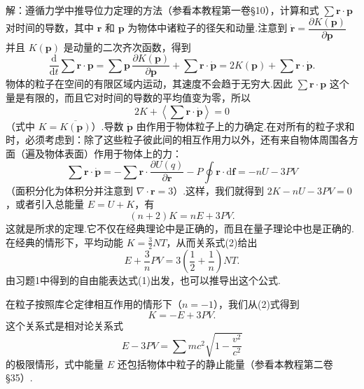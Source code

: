 \begin{xiti}
解：遵循力学中推导位力定理的方法（参看本教程第一卷§10），计算和式 $\sum\boldsymbol{r}\cdot\boldsymbol{p}$ 对时间的导数，其中 $\boldsymbol{r}$ 和 $\boldsymbol{p}$ 为物体中诸粒子的径矢和动量.注意到 $\dot{\boldsymbol{r}}=\dfrac{\partial K(\boldsymbol{p})}{\partial\boldsymbol{p}}$ 并且 $K(\boldsymbol{p})$ 是动量的二次齐次函数，得到
\begin{equation*}
  \frac{\mathrm{d}}{\mathrm{d}t}\sum\boldsymbol{r}\cdot\boldsymbol{p}
  =\sum\boldsymbol{p}\,\frac{\partial K(\boldsymbol{p})}{\partial\boldsymbol{p}}
  +\sum\boldsymbol{r}\cdot\dot{\boldsymbol{p}}
  =2K(\boldsymbol{p})+\sum\boldsymbol{r}\cdot\dot{\boldsymbol{p}}.
\end{equation*}
物体的粒子在空间的有限区域内运动，其速度不会趋于无穷大.因此 $\sum\boldsymbol{r}\cdot\boldsymbol{p}$ 这个量是有限的，而且它对时间的导数的平均值变为零，所以
\begin{equation*}
  2K+\left\langle\sum\boldsymbol{r}\cdot\dot{\boldsymbol{p}}\right\rangle=0
\end{equation*}
（式中 $K=\overline{K(\boldsymbol{p})}$）.导数 $\dot{\boldsymbol{p}}$ 由作用于物体粒子上的力确定.在对所有的粒子求和时，必须考虑到：除了这些粒子彼此间的相互作用力以外，还有来自物体周围各方面（遍及物体表面）作用于物体上的力：
\begin{equation*}
  \sum\boldsymbol{r}\cdot\dot{\boldsymbol{p}}
  =-\sum\boldsymbol{r}\cdot\frac{\partial U(q)}{\partial\boldsymbol{r}}
  -P\oint\boldsymbol{r}\cdot\mathrm{d}\boldsymbol{f}
  =-nU-3PV
\end{equation*}
（面积分化为体积分并注意到 $\nabla\cdot\boldsymbol{r}=3$）.这样，我们就得到 $2K-nU-3PV=0$，或者引入总能量 $E=U+K$，有
\begin{equation*}
  (n+2)K=nE+3PV.
\end{equation*}
这就是所求的定理.它不仅在经典理论中是正确的，而且在量子理论中也是正确的.在经典的情形下，平均动能 $K=\frac{3}{2}NT$，从而关系式(2)给出
\begin{equation*}
  E+\frac{3}{n}PV=3\left(\frac{1}{2}+\frac{1}{n}\right)NT.
\end{equation*}
由习题1中得到的自由能表达式(1)出发，也可以推导出这个公式.

在粒子按照库仑定律相互作用的情形下（$n=-1$），我们从(2)式得到
\begin{equation*}
  K=-E+3PV.
\end{equation*}
这个关系式是相对论关系式
\begin{equation*}
  E-3PV=\sum mc^2\sqrt{1-\frac{v^2}{c^2}}
\end{equation*}
的极限情形，式中能量 $E$ 还包括物体中粒子的静止能量（参看本教程第二卷§35）.

\end{xiti}

